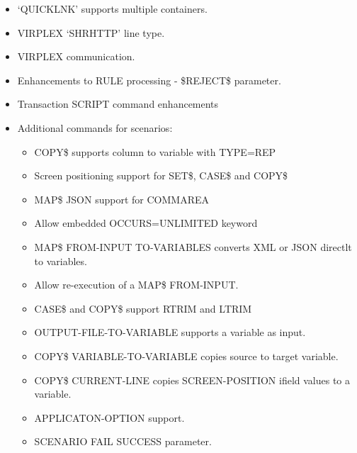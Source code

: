 \documentclass[letterpaper,10pt,english]{sphinxmanual}
\begin{document}
\begin{itemize}
\item {} 
‘QUICKLNK’ supports multiple containers.

\item {} 
VIRPLEX ‘SHRHTTP’ line type.

\item {} 
VIRPLEX communication.

\item {} 
Enhancements to RULE processing - \$REJECT\$ parameter.

\item {} 
Transaction SCRIPT command enhancements

\item {} 
Additional commands for scenarios:
\begin{itemize}
\item {} 
COPY\$ supports column to variable with TYPE=REP

\item {} 
Screen positioning support for SET\$, CASE\$ and COPY\$

\item {} 
MAP\$ JSON support for COMMAREA

\item {} 
Allow embedded OCCURS=UNLIMITED keyword

\item {} 
MAP\$ FROM-INPUT TO-VARIABLES converts XML or JSON directlt to variables.

\item {} 
Allow re-execution of a MAP\$ FROM-INPUT.

\item {} 
CASE\$ and COPY\$ support RTRIM and LTRIM

\item {} 
OUTPUT-FILE-TO-VARIABLE supports a variable as input.

\item {} 
COPY\$ VARIABLE-TO-VARIABLE copies source to target variable.

\item {} 
COPY\$ CURRENT-LINE copies SCREEN-POSITION ifield values to a variable.

\item {} 
APPLICATON-OPTION support.

\item {} 
SCENARIO FAIL \textbar{} SUCCESS parameter.

\end{itemize}

\end{itemize}
\end{document}
